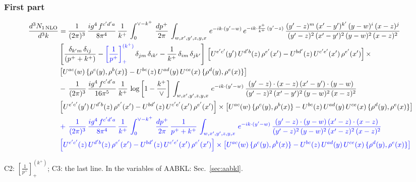 \documentclass[9pt]{article}
\newcommand{\new}[1]{{\color{blue}#1}}
\newcommand{\nc}{\color{blue}}
\numberwithin{equation}{section}
\begin{document}
 \subsubsection{First part}
 \begin{align}
     \frac{d^{3}N_{1\,\rm NLO}}{d^{3}k} & = \frac{1}{(2\pi)^{3}}\, \frac{ig^{4}\,f^{c'd'a}}{8\pi^{4}}\, \frac{1}{k^{+}}\,\int_{0}^{\vee-k^{+}}\,  \frac{dp^{+}}{2\pi}\, \int_{w,x',y',z,y,x}\, e^{-ik\cdot (y'-w)}\, e^{-ik\cdot \frac{p^{+}}{k^{+}}\,(y'-z)}\,\frac{(y'-z)^{m}\,(x'-y')^{k'}\,(y-w)^{i}\,(x-z)^{j}}{(y'-z)^{2}\,(x'-y')^{2}\,(y-w)^{2}\,(x-z)^{2}}\notag \\ & \left[\frac{\delta_{k'm}\,\delta_{ij}}{(p^{+}+k^{+})}-\new{\left[\frac{1}{p^{+}}\right]_{+}^{(k^{+})}}\,\delta_{jm}\,\delta_{ik'}-\frac{1}{k^{+}}\, \delta_{im}\, \delta_{jk'}\right]\, \left[U^{e'c'}(y')\,U^{d'b}(z)\,\rho^{e'}(x')-U^{bd'}(z)\,U^{c'e'}(x')\,\rho^{e'}(x')\right]\times\notag \\ &  \left[U^{ac}(w)\, \{\rho^{c}(y),\rho^{b}(x)\}-U^{bc}(z)\,U^{ad}(y)\,U^{ce}(x)\,\{\rho^{d}(y),\rho^{e}(x)\}\right]\notag \\ & -\,\frac{1}{(2\pi)^{3}}\, \frac{ig^{4}\,f^{c'd'a}}{16\pi^{5}}\, \frac{1}{k^{+}}\, \log{\left[1-\frac{k^{+}}{\vee}\right]}\, \int_{w,x',y',z,y,x}\, e^{-ik\cdot (y'-w)}\,\frac{(y'-z)\cdot (x-z)\,(x'-y')\cdot (y-w)}{(y'-z)^{2}\,(x'-y')^{2}\,(y-w)^{2}\,(x-z)^{2}}\notag \\ &  \left[U^{e'c'}(y')\,U^{d'b}(z)\,\rho^{e'}(x')-U^{bd'}(z)\,U^{c'e'}(x')\,\rho^{e'}(x')\right]\times  \left[U^{ac}(w)\, \{\rho^{c}(y),\rho^{b}(x)\}-U^{bc}(z)\,U^{ad}(y)\,U^{ce}(x)\,\{\rho^{d}(y),\rho^{e}(x)\}\right]
\notag \\ & \nc +\,\frac{1}{(2\pi)^{3}}\, \frac{ig^{4}\,f^{c'd'a}}{8\pi^{4}}\, \frac{1}{k^{+}}\,\int_{0}^{\vee-k^{+}}\, \frac{dp^{+}}{2\pi}\,\frac{1}{p^{+}+k^{+}}\, \int_{w,x',y',z,y,x}\, e^{-ik\cdot (y'-w)}\,\frac{(y'-z)\cdot (y-w)\,(x'-z)\cdot (x-z)}{(y'-z)^{2}\,(y-w)^{2}\,(x'-z)^{2}\,(x-z)^{2}}\notag \\ & \nc \left[U^{e'c'}(z)\,U^{d'b}(z)\,\rho^{e'}(x')-U^{bd'}(z)\,U^{c'e'}(x')\,\rho^{e'}(x')\right]\times\left[U^{ac}(w)\, \{\rho^{c}(y),\rho^{b}(x)\}-U^{bc}(z)\,U^{ad}(y)\,U^{ce}(x)\,\{\rho^{d}(y),\rho^{e}(x)\}\right]
\end{align}

\new{C2: $\left[\frac{1}{p^+}\right]_+^{(k^+)}$; C3: the last line. In the variables of AABKL: Sec.~\ref{sec:aabkl}.}
\end{document}
